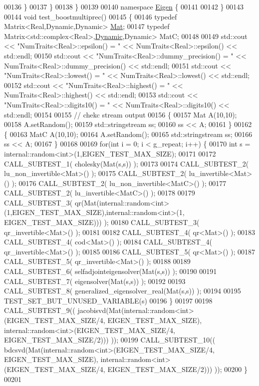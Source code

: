 \begin{DoxyCode}
00136   \}
00137 \}
00138 \}
00139 
00140 \textcolor{keyword}{namespace }\hyperlink{namespace_eigen}{Eigen} \{
00141 
00142 \}
00143 
00144 \textcolor{keywordtype}{void} test\_boostmultiprec()
00145 \{
00146   \textcolor{keyword}{typedef} Matrix<Real,Dynamic,Dynamic> \hyperlink{group___core___module}{Mat};
00147   \textcolor{keyword}{typedef} Matrix<std::complex<Real>,\hyperlink{namespace_eigen_ad81fa7195215a0ce30017dfac309f0b2}{Dynamic},Dynamic> MatC;
00148 
00149   std::cout << \textcolor{stringliteral}{"NumTraits<Real>::epsilon()         = "} << NumTraits<Real>::epsilon() << std::endl;
00150   std::cout << \textcolor{stringliteral}{"NumTraits<Real>::dummy\_precision() = "} << NumTraits<Real>::dummy\_precision() << std::endl;
00151   std::cout << \textcolor{stringliteral}{"NumTraits<Real>::lowest()          = "} << NumTraits<Real>::lowest() << std::endl;
00152   std::cout << \textcolor{stringliteral}{"NumTraits<Real>::highest()         = "} << NumTraits<Real>::highest() << std::endl;
00153   std::cout << \textcolor{stringliteral}{"NumTraits<Real>::digits10()        = "} << NumTraits<Real>::digits10() << std::endl;
00154 
00155   \textcolor{comment}{// chekc stream output}
00156   \{
00157     Mat A(10,10);
00158     A.setRandom();
00159     std::stringstream ss;
00160     ss << A;
00161   \}
00162   \{
00163     MatC A(10,10);
00164     A.setRandom();
00165     std::stringstream ss;
00166     ss << A;
00167   \}
00168 
00169   \textcolor{keywordflow}{for}(\textcolor{keywordtype}{int} i = 0; i < g\_repeat; i++) \{
00170     \textcolor{keywordtype}{int} s = internal::random<int>(1,EIGEN\_TEST\_MAX\_SIZE);
00171 
00172     CALL\_SUBTEST\_1( cholesky(Mat(s,s)) );
00173 
00174     CALL\_SUBTEST\_2( lu\_non\_invertible<Mat>() );
00175     CALL\_SUBTEST\_2( lu\_invertible<Mat>() );
00176     CALL\_SUBTEST\_2( lu\_non\_invertible<MatC>() );
00177     CALL\_SUBTEST\_2( lu\_invertible<MatC>() );
00178 
00179     CALL\_SUBTEST\_3( qr(Mat(internal::random<int>(1,EIGEN\_TEST\_MAX\_SIZE),internal::random<int>(1,
      EIGEN\_TEST\_MAX\_SIZE))) );
00180     CALL\_SUBTEST\_3( qr\_invertible<Mat>() );
00181 
00182     CALL\_SUBTEST\_4( qr<Mat>() );
00183     CALL\_SUBTEST\_4( cod<Mat>() );
00184     CALL\_SUBTEST\_4( qr\_invertible<Mat>() );
00185 
00186     CALL\_SUBTEST\_5( qr<Mat>() );
00187     CALL\_SUBTEST\_5( qr\_invertible<Mat>() );
00188 
00189     CALL\_SUBTEST\_6( selfadjointeigensolver(Mat(s,s)) );
00190 
00191     CALL\_SUBTEST\_7( eigensolver(Mat(s,s)) );
00192 
00193     CALL\_SUBTEST\_8( generalized\_eigensolver\_real(Mat(s,s)) );
00194 
00195     TEST\_SET\_BUT\_UNUSED\_VARIABLE(s)
00196   \}
00197 
00198   CALL\_SUBTEST\_9(( jacobisvd(Mat(internal::random<int>(EIGEN\_TEST\_MAX\_SIZE/4, EIGEN\_TEST\_MAX\_SIZE), 
      internal::random<int>(EIGEN\_TEST\_MAX\_SIZE/4, EIGEN\_TEST\_MAX\_SIZE/2))) ));
00199   CALL\_SUBTEST\_10(( bdcsvd(Mat(internal::random<int>(EIGEN\_TEST\_MAX\_SIZE/4, EIGEN\_TEST\_MAX\_SIZE), 
      internal::random<int>(EIGEN\_TEST\_MAX\_SIZE/4, EIGEN\_TEST\_MAX\_SIZE/2))) ));
00200 \}
00201 
\end{DoxyCode}

